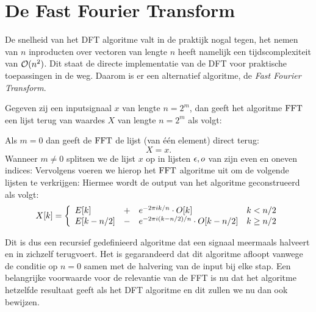 \section{De Fast Fourier Transform}
\label{fft_sec}
De snelheid van het DFT algoritme valt in de praktijk nogal tegen, het nemen van $n$ inproducten over vectoren 
van lengte $n$ heeft namelijk een tijdscomplexiteit van $\mathcal{O}(n^2)$. Dit staat de directe implementatie van de DFT 
voor praktische toepassingen in de weg. Daarom is er een alternatief algoritme, de \emph{Fast Fourier Transform}.  \bigskip

\begin{algo}
Gegeven zij een inputsignaal $x$ van lengte $n=2^m$, dan geeft het algoritme $\text{FFT}$ 
een lijst terug van waardes $X$ van lengte $n=2^m$ als volgt:

Als $m=0$ dan geeft de $\text{FFT}$ de lijst (van \'e\'en element) direct terug:
\[
X = x.
\]
Wanneer $m\neq0$ splitsen we de lijst $x$ op in lijsten $\epsilon,o$ van zijn even en oneven indices:
Vervolgens voeren we hierop het $\text{FFT}$ algoritme uit om de volgende lijsten te verkrijgen:
Hiermee wordt de output van het algoritme geconstrueerd als volgt:
\[
  X[k] = \left\{\begin{array}{llll}
    E[k]         &+& e^{-{2\pi i} k/n}\cdot O[k] &  k< n/2 \\
    E[k-n/2] &-& e^{-{2\pi i} (k-n/2)/n}\cdot O[k-n/2] &  k\geq n/2 
  \end{array}\right.
\]
\end{algo}

Dit is dus een recursief gedefinieerd algoritme dat een signaal meermaals halveert en in zichzelf terugvoert.
Het is gegarandeerd dat dit algoritme afloopt vanwege de conditie op $n=0$ samen met de halvering van de input bij elke stap. Een belangrijke voorwaarde voor de relevantie van de FFT is nu dat het algoritme hetzelfde resultaat geeft als het DFT algoritme en dit zullen we nu dan ook bewijzen. 

